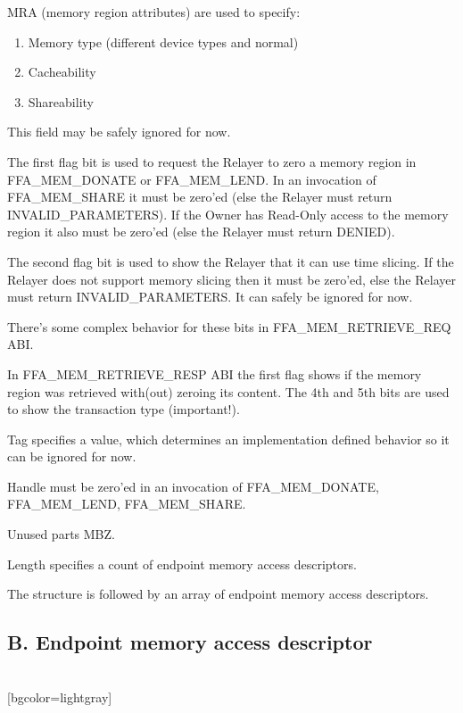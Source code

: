 \documentclass{article}
\begin{document}
MRA (memory region attributes) are used to specify:
\begin{enumerate}
    \item Memory type (different device types and normal)
    \item Cacheability
    \item Shareability 
\end{enumerate}

This field may be safely ignored for now.

The first flag bit is used to request the Relayer to zero a memory region in FFA\_MEM\_DONATE or FFA\_MEM\_LEND. In an invocation of FFA\_MEM\_SHARE it must be zero'ed (else the Relayer must return INVALID\_PARAMETERS). If the Owner has Read-Only access to the memory region it also must be zero'ed (else the Relayer must return DENIED).

The second flag bit is used to show the Relayer that it can use time slicing. If the Relayer does not support memory slicing then it must be zero'ed, else the Relayer must return INVALID\_PARAMETERS. It can safely be ignored for now.

There's some complex behavior for these bits in FFA\_MEM\_RETRIEVE\_REQ ABI.

In FFA\_MEM\_RETRIEVE\_RESP ABI the first flag shows if the memory region was retrieved with(out) zeroing its content. The 4th and 5th bits are used to show the transaction type (important!). 

Tag specifies a value, which determines an implementation defined behavior so it can be ignored for now.

Handle must be zero'ed in an invocation of FFA\_MEM\_DONATE, FFA\_MEM\_LEND, FFA\_MEM\_SHARE.

Unused parts MBZ.

Length specifies a count of endpoint memory access descriptors.

The structure is followed by an array of endpoint memory access descriptors.

\subsection*{B. Endpoint memory access descriptor}

\begin{bytefield}[bitwidth=2.5em]{16}
	\\	
	[bgcolor=lightgray]{}
\end{bytefield}
\end{document}
